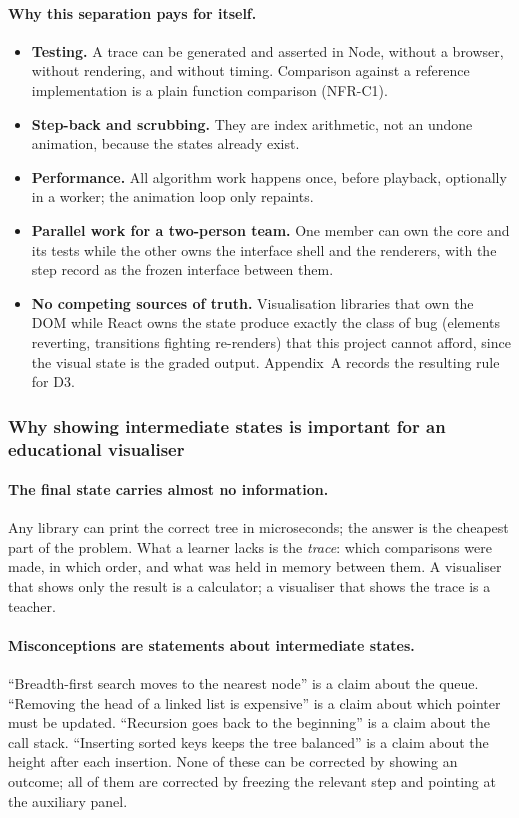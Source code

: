 \documentclass[11pt,a4paper]{article}
\begin{document}
\paragraph{Why this separation pays for itself.}
\begin{itemize}[leftmargin=1.6em,itemsep=2pt]
  \item \textbf{Testing.} A trace can be generated and asserted in Node, without a browser,
        without rendering, and without timing. Comparison against a reference implementation
        is a plain function comparison (NFR-C1).
  \item \textbf{Step-back and scrubbing.} They are index arithmetic, not an undone
        animation, because the states already exist.
  \item \textbf{Performance.} All algorithm work happens once, before playback, optionally
        in a worker; the animation loop only repaints.
  \item \textbf{Parallel work for a two-person team.} One member can own the core and its
        tests while the other owns the interface shell and the renderers, with the step
        record as the frozen interface between them.
  \item \textbf{No competing sources of truth.} Visualisation libraries that own the DOM
        while React owns the state produce exactly the class of bug (elements reverting,
        transitions fighting re-renders) that this project cannot afford, since the visual
        state is the graded output. Appendix~A records the resulting rule for D3.
\end{itemize}

\subsubsection{Why showing intermediate states is important for an educational visualiser}

\paragraph{The final state carries almost no information.} Any library can print the correct
tree in microseconds; the answer is the cheapest part of the problem. What a learner lacks is
the \emph{trace}: which comparisons were made, in which order, and what was held in memory
between them. A visualiser that shows only the result is a calculator; a visualiser that
shows the trace is a teacher.

\paragraph{Misconceptions are statements about intermediate states.} ``Breadth-first search
moves to the nearest node'' is a claim about the queue. ``Removing the head of a linked list
is expensive'' is a claim about which pointer must be updated. ``Recursion goes back to the
beginning'' is a claim about the call stack. ``Inserting sorted keys keeps the tree balanced''
is a claim about the height after each insertion. None of these can be corrected by showing
an outcome; all of them are corrected by freezing the relevant step and pointing at the
auxiliary panel.
\end{document}
